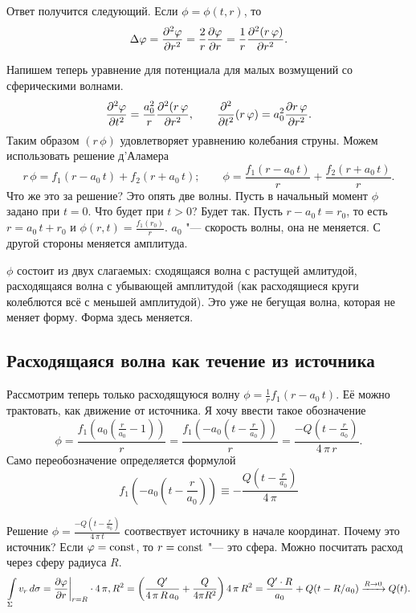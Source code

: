Ответ получится следующий. Если $\phi = \phi (t,r)$, то
\[
  \Delta\varphi = \frac{\partial ^2\varphi}{\partial r^2} = \frac2r\frac{\partial \varphi}{\partial r} = \frac1r\frac{\partial ^2(r\,\varphi)}{\partial r^2}.
\]

Напишем теперь уравнение для потенциала для малых возмущений со сферическими волнами.
\[
  \frac{\partial ^2\varphi}{\partial t^2} = \frac{a_0^2}r\frac{\partial ^2(r\,\varphi}{\partial r^2},\qquad
  \frac{\partial ^2}{\partial t^2}(r\,\varphi) = a_0^2\frac{\partial r\,\varphi}{\partial r^2}.
\]
Таким образом $(r\,\phi)$ удовлетворяет уравнению колебания струны. Можем использовать решение д'Аламера
\[
  r\,\phi = f_1(r-a_0\,t) + f_2(r+a_0\,t);\qquad \phi = \frac{f_1(r-a_0\,t)}r + \frac{f_2(r+a_0\,t)}r.
\]
Что же это за решение? Это опять две волны. Пусть в начальный момент $\phi$ задано при $t=0$. Что будет при $t>0$? Будет так. Пусть $r-a_0\,t = r_0$, то есть $r = a_0\,t + r_0$ и $\phi(r,t) = \frac{f_1(r_0)}r$. $a_0$ "--- скорость волны, она не меняется. С другой стороны меняется амплитуда.

$\phi$ состоит из двух слагаемых: сходящаяся волна с растущей амлитудой, расходящаяся волна с убывающей амплитудой (как расходящиеся круги колеблются всё с меньшей амплитудой). Это уже не бегущая волна, которая не меняет форму. Форма здесь меняется.

\subsection{Расходящаяся волна как течение из источника}
Рассмотрим теперь только расходящуюся волну $\phi = \frac1rf_1(r-a_0\,t)$. Её можно трактовать, как движение от источника. Я хочу ввести такое обозначение 
\[
  \phi = \frac{f_1\left(a_0\left(\frac r{a_0} - 1\right)\right)}r = 
  \frac{f_1\left(-a_0\left(t - \frac r{a_0}\right)\right)}r = 
  \frac{-Q\left(t - \frac r{a_0}\right)}{4\,\pi\,r}.
\]
Само переобозначение определяется формулой
\begin{equation}
  f_1\left(-a_0\left(t - \frac r{a_0}\right)\right)\equiv - \frac{Q\left(t - \frac r{a_0}\right)}{4\,\pi}
\end{equation}

Решение $\phi=
  \frac{-Q\left(t - \frac r{a_0}\right)}{4\,\pi\,t}$ соотвествует источнику в начале координат. Почему это источник?
 Если $\varphi=\operatorname{const}$, то $r=\operatorname{const}$ "--- это сфера. Можно посчитать расход через сферу радиуса $R$.
\[
  \int\limits_{\Sigma}v_r\,d\sigma = \frac{\partial \varphi}{\partial r}\bigg|_{r=R}\cdot 4\,\pi,R^2 = 
  \left(\frac{Q'}{4\,\pi\,R\,a_0} + \frac Q{4\pi R^2}\right)4\,\pi\,R^2 = 
  \frac{Q'\cdot R}{a_0} + Q(t-R/a_0)\xrightarrow{R\rightarrow0}Q(t).
\]


